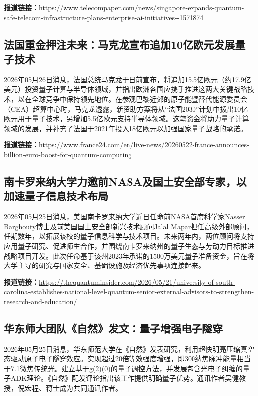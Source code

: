 \documentclass[12pt,a4paper]{ctexart}
\begin{document}
\noindent\textbf{报道链接：}\url{https://www.telecompaper.com/news/singapore-expands-quantum-safe-telecom-infrastructure-plans-enterprise-ai-initiatives--1571874}

\subsection{ 法国重金押注未来：马克龙宣布追加10亿欧元发展量子技术 }

2026年05月26日消息，法国总统马克龙于日前宣布，将追加15.5亿欧元（约17.9亿美元）投资量子计算与半导体领域，并指出欧洲各国应携手推进这两大关键战略技术，以在全球竞争中保持领先地位。在参观巴黎近郊的原子能暨替代能源委员会（CEA）超算中心时，马克龙透露，新资助方案将从“法国2030”计划中拨出10亿欧元用于量子技术，另增加5.5亿欧元支持半导体领域。这笔资金将助力量子计算领域的发展，并补充了法国于2021年投入18亿欧元以加强国家量子战略的承诺。

\noindent\textbf{报道链接：}\url{https://www.france24.com/en/live-news/20260522-france-announces-billion-euro-boost-for-quantum-computing}

\subsection{ 南卡罗来纳大学力邀前NASA及国土安全部专家，以加速量子信息技术布局 }

2026年05月25日消息，美国南卡罗来纳大学近日任命前NASA首席科学家Nasser Barghouty博士及前美国国土安全部新兴技术顾问Jalal Mapar担任高级外部顾问，任期数年，以拓展该校的量子信息科学与技术项目。未来两年内，两位顾问将支持应用量子研究、促进师生合作，并围绕南卡罗来纳州的量子生态与劳动力目标推进战略项目开发。此次任命基于该州2023年承诺的1500万美元量子准备资金，旨在将大学主导的研究与国家安全、基础设施及经济优先事项连接起来。

\noindent\textbf{报道链接：}\url{https://thequantuminsider.com/2026/05/21/university-of-south-carolina-establishes-national-level-quantum-senior-external-advisors-to-strengthen-research-and-education/}

\subsection{ 华东师大团队《自然》发文：量子增强电子隧穿 }

2026年05月25日消息，华东师范大学在《自然》发表研究，利用超快明亮压缩真空态驱动原子电子隧穿效应。实现超过20倍等效强度增强，即300纳焦脉冲能量相当于7.1微焦传统光。建立基于g(2)(0)的量子调控方法，并发展包含光电子纠缠的量子ADK理论。《自然》配发评论指出该工作提供明确量子优势。通讯作者吴健教授，倪宏程、蒋士成为共同通讯作者。
\end{document}
